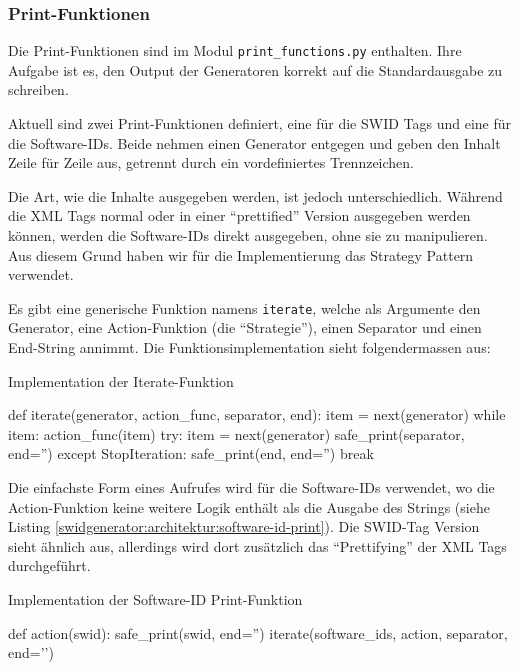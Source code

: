\subsubsection{Print-Funktionen}
\label{swidgenerator:architektur:printers}

Die Print-Funktionen sind im Modul \texttt{print\_functions.py} enthalten. Ihre
Aufgabe ist es, den Output der Generatoren korrekt auf die Standardausgabe zu
schreiben.

Aktuell sind zwei Print-Funktionen definiert, eine für die SWID Tags und eine
für die Software-IDs. Beide nehmen einen Generator entgegen und geben den Inhalt
Zeile für Zeile aus, getrennt durch ein vordefiniertes Trennzeichen.

Die Art, wie die Inhalte ausgegeben werden, ist jedoch unterschiedlich. Während
die XML Tags normal oder in einer \enquote{prettified} Version ausgegeben werden
können, werden die Software-IDs direkt ausgegeben, ohne sie zu manipulieren. Aus
diesem Grund haben wir für die Implementierung das Strategy
Pattern\cite{gamma1994design} verwendet.

Es gibt eine generische Funktion namens \texttt{iterate}, welche als Argumente
den Generator, eine Action-Funktion (die \enquote{Strategie}), einen Separator
und einen End-String annimmt. Die Funktionsimplementation sieht folgendermassen
aus:

\begin{listing}[H]
\caption{Implementation der Iterate-Funktion}
\begin{pythoncode}
def iterate(generator, action_func, separator, end):
    item = next(generator)
    while item:
        action_func(item)
        try:
            item = next(generator)
            safe_print(separator, end='')
        except StopIteration:
            safe_print(end, end='')
            break
\end{pythoncode}
\end{listing}

Die einfachste Form eines Aufrufes wird für die Software-IDs verwendet, wo die
Action-Funktion keine weitere Logik enthält als die Ausgabe des Strings (siehe
Listing \ref{swidgenerator:architektur:software-id-print}). Die SWID-Tag Version
sieht ähnlich aus, allerdings wird dort zusätzlich das \enquote{Prettifying} der
XML Tags durchgeführt.

\begin{listing}[H]
\caption{Implementation der Software-ID Print-Funktion}
\label{swidgenerator:architektur:software-id-print}
\begin{pythoncode}
def action(swid):
    safe_print(swid, end='')
iterate(software_ids, action, separator, end='\n')
\end{pythoncode}
\end{listing}

